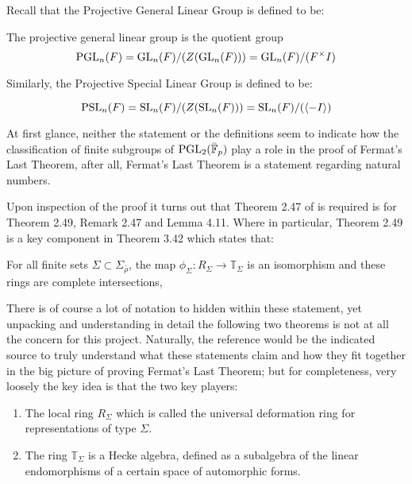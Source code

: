Recall that the Projective General Linear Group is defined to be:

\begin{definition}
    The projective general linear group is the quotient group
    \[    
    \operatorname{PGL}_n(F) = \operatorname{GL}_n(F) / (Z(\operatorname{GL}_n(F))) = \operatorname{GL}_n(F) / (F^\times I) 
    \]
\end{definition}

Similarly, the Projective Special Linear Group is defined to be:

\begin{definition}
    \[
    \operatorname{PSL}_n(F) = \operatorname{SL}_n(F) / (Z(\operatorname{SL}_n(F))) = \operatorname{SL}_n(F) / (\langle -I\rangle)
    \]
\end{definition}

At first glance, neither the statement or the definitions seem to indicate how the classification of finite subgroups of $\operatorname{PGL}_2(\bar{\mathbb{F}}_p)$ play a role in the proof of Fermat's Last Theorem, after all, Fermat's Last Theorem is a statement
regarding natural numbers. 

Upon inspection of the proof it turns out that Theorem 2.47 of \cite{dtt} is required is for Theorem 2.49, Remark 2.47 and Lemma 4.11. Where in particular, Theorem 2.49 is a key component in Theorem 3.42 which states that:

\begin{theorem}[Theorem 3.42]
    For all finite sets $\Sigma \subset \Sigma_{\bar{\rho}}$, the map $\phi_\Sigma : R_\Sigma \rightarrow \mathbb{T}_\Sigma$ is an isomorphism and these rings are complete intersections,
\end{theorem}

There is of course a lot of notation to hidden within these statement, yet unpacking and understanding in detail the following two theorems is not at all the concern for this project. 
Naturally, the reference \cite{dtt} would be the indicated source to truly understand what these statements claim and how they fit together in the big picture of proving Fermat's Last Theorem; but for completeness,
very loosely the key idea is that the two key players:

\begin{enumerate}
    \item The local ring $R_\Sigma$ which is called the universal deformation ring for representations of type $\Sigma$.
    
    \item The ring $\mathbb{T}_\Sigma$ is a Hecke algebra, defined as a subalgebra of the linear endomorphisms of a certain space of automorphic forms.
\end{enumerate}

